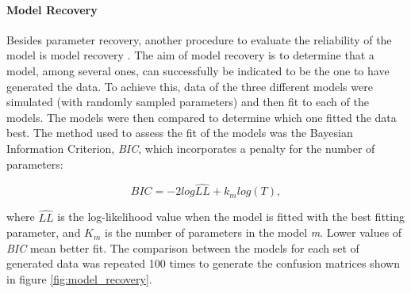 \documentclass[a4paper,12pt]{article} 			%
\begin{document}
\paragraph{Model Recovery}
Besides parameter recovery, another procedure to evaluate the reliability of the model is model recovery \citep{Wilson2019a}. The aim of model recovery is to determine that a model, among several ones, can successfully be indicated to be the one to have generated the data. To achieve this, data of the three different models were simulated (with randomly sampled parameters) and then fit to each of the models. The models were then compared to determine which one fitted the data best. The method used to assess the fit of the models was the Bayesian Information Criterion, \textit{BIC}, which incorporates a penalty for the number of parameters:

\begin{equation}
BIC = {-2}log \hat{LL} + k_m log{(T)},
\label{eq:BIC}
\end{equation}

\noindent
where $\hat{LL}$ is the log-likelihood value when the model is fitted with the best fitting parameter, and $K_m$ is the number of parameters in the model \textit{m}. Lower values of \textit{BIC} mean better fit. The comparison between the models for each set of generated data was repeated 100 times to generate the confusion matrices shown in figure \ref{fig:model_recovery}.



\end{document}

